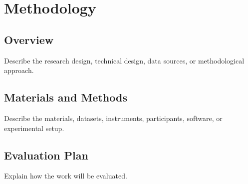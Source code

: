 \chapter{Methodology}
\label{ch:methodology}

\section{Overview}
\label{sec:method-overview}

Describe the research design, technical design, data sources, or methodological
approach.

\section{Materials and Methods}
\label{sec:materials-methods}

Describe the materials, datasets, instruments, participants, software, or
experimental setup.

\section{Evaluation Plan}
\label{sec:evaluation-plan}

Explain how the work will be evaluated.
